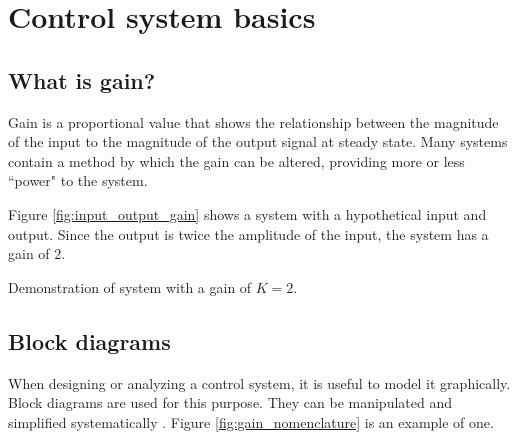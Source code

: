 
\chapter{Control system basics}

\section{What is gain?}

Gain is a proportional value that shows the relationship between the magnitude
of the input to the magnitude of the output signal at steady state. Many
\glspl{system} contain a method by which the gain can be altered, providing more
or less ``power" to the \gls{system}.

Figure \ref{fig:input_output_gain} shows a system with a hypothetical input and
output. Since the output is twice the amplitude of the input, the system has a
gain of $2$.

\begin{bookfigure}

  \caption{Demonstration of system with a gain of $K = 2$.}
  \label{fig:input_output_gain}
\end{bookfigure}

\section{Block diagrams}

When designing or analyzing a control system, it is useful to model it
graphically. Block diagrams are used for this purpose. They can be manipulated
and simplified systematically \cite{bib:block_diagrams}. Figure
\ref{fig:gain_nomenclature} is an example of one.

